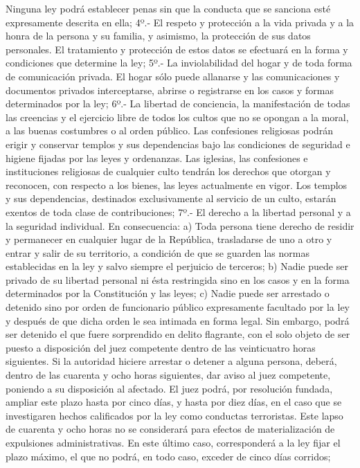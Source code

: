     Ninguna ley podrá establecer penas sin que la conducta que se sanciona esté expresamente descrita en ella;
    4º.- El respeto y protección a la vida privada y a la honra de la persona y su familia, y asimismo, la protección de sus datos personales. El tratamiento y protección de estos datos se efectuará en la forma y condiciones que determine la ley;
    5º.- La inviolabilidad del hogar y de toda forma de comunicación privada. El hogar sólo puede allanarse y las comunicaciones y documentos privados interceptarse, abrirse o registrarse en los casos y formas determinados por la ley;
    6º.- La libertad de conciencia, la manifestación de todas las creencias y el ejercicio libre de todos los cultos que no se opongan a la moral, a las buenas costumbres o al orden público.
    Las confesiones religiosas podrán erigir y conservar templos y sus dependencias bajo las condiciones de seguridad e higiene fijadas por las leyes y ordenanzas.
    Las iglesias, las confesiones e instituciones religiosas de cualquier culto tendrán los derechos que otorgan y reconocen, con respecto a los bienes, las leyes actualmente en vigor. Los templos y sus dependencias, destinados exclusivamente al servicio de un culto, estarán exentos de toda clase de contribuciones;
    7º.- El derecho a la libertad personal y a la seguridad individual.
    En consecuencia:
    a) Toda persona tiene derecho de residir y permanecer en cualquier lugar de la República, trasladarse de uno a otro y entrar y salir de su territorio, a condición de que se guarden las normas establecidas en la ley y salvo siempre el perjuicio de terceros;
    b) Nadie puede ser privado de su libertad personal ni ésta restringida sino en los casos y en la forma determinados por la Constitución y las leyes;
    c) Nadie puede ser arrestado o detenido sino por orden de funcionario público expresamente facultado por la ley y después de que dicha orden le sea intimada en forma legal. Sin embargo, podrá ser detenido el que fuere sorprendido en delito flagrante, con el solo objeto de ser puesto a disposición del juez competente dentro de las veinticuatro horas siguientes.
    Si la autoridad hiciere arrestar o detener a alguna persona, deberá, dentro de las cuarenta y ocho horas siguientes, dar aviso al juez competente, poniendo a su disposición al afectado. El juez podrá, por resolución fundada, ampliar este plazo hasta por cinco días, y hasta por diez días, en el caso que se investigaren hechos calificados por la ley como conductas terroristas.
    Este lapso de cuarenta y ocho horas no se considerará para efectos de materialización de expulsiones administrativas. En este último caso, corresponderá a la ley fijar el plazo máximo, el que no podrá, en todo caso, exceder de cinco días corridos;
